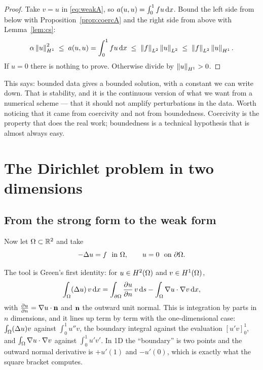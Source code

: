 \documentclass[11pt,a4paper]{article}
\begin{document}
\begin{proof}
Take $v=u$ in \eqref{eq:weakA}, so $a(u,u) = \int_0^1 fu \,\mathrm{d}x$. Bound the left
side from below with Proposition~\ref{prop:coercA} and the right side from above
with Lemma~\ref{lem:cs}:
\[
  \alpha\left\lVert u \right\rVert_{H^{1}}^{2} \;\le\; a(u,u) = \int_0^1 fu \,\mathrm{d}x
  \;\le\; \left\lVert f \right\rVert_{L^{2}}\left\lVert u \right\rVert_{L^{2}} \;\le\; \left\lVert f \right\rVert_{L^{2}}\left\lVert u \right\rVert_{H^{1}} .
\]
If $u=0$ there is nothing to prove. Otherwise divide by $\left\lVert u \right\rVert_{H^{1}} > 0$.
\end{proof}

\begin{remark}
This says: bounded data gives a bounded solution, with a constant we can write
down. That is stability, and it is the continuous version of what we want from a
numerical scheme --- that it should not amplify perturbations in the data. Worth
noticing that it came from coercivity and not from boundedness. Coercivity is the
property that does the real work; boundedness is a technical hypothesis that is
almost always easy.
\end{remark}

\section{The Dirichlet problem in two dimensions}

\subsection{From the strong form to the weak form}

Now let $\Omega \subset \mathbb{R}^{2}$ and take
\begin{equation}\label{eq:strongB}
  -\Delta u = f \ \text{ in } \Omega, \qquad u = 0 \ \text{ on } \partial\Omega .
\end{equation}

The tool is Green's first identity: for $u \in H^{2}(\Omega)$ and $v \in H^{1}(\Omega)$,
\begin{equation}\label{eq:green}
  \int_\Omega (\Delta u)\,v \,\mathrm{d}x
  = \int_{\partial\Omega} \frac{\partial u}{\partial n}\,v \,\mathrm{d}s - \int_\Omega \nabla u \cdot \nabla v \,\mathrm{d}x ,
\end{equation}
with $\frac{\partial u}{\partial n} = \nabla u \cdot \mathbf{n}$ and $\mathbf{n}$ the outward unit normal. This is
integration by parts in $n$ dimensions, and it lines up term by term with the
one-dimensional case: $\int_\Omega (\Delta u)v$ against $\int_0^1 u''v$, the boundary
integral against the evaluation $[u'v]_0^1$, and
$\int_\Omega \nabla u \cdot \nabla v$ against $\int_0^1 u'v'$. In 1D the ``boundary''
is two points and the outward normal derivative is $+u'(1)$ and $-u'(0)$, which
is exactly what the square bracket computes.
\end{document}
